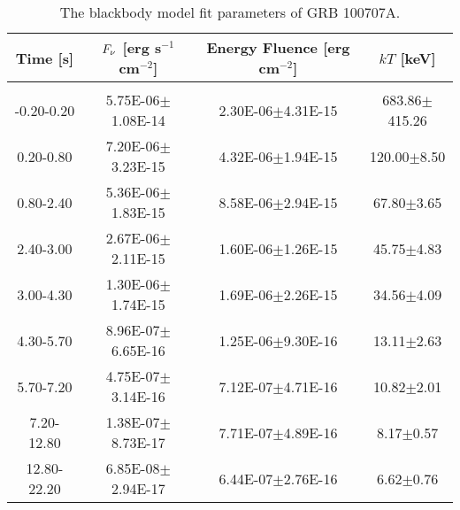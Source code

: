 \begin{table}[h]
\centering
\scriptsize
\label{tab:}
\begin{tabular}{c| c c c}
Time [s] & $F_{\nu}$ [erg s$^{-1}$ cm$^{-2}$] & Energy Fluence [erg cm$^{-2}$] & $kT$ [keV] \\
\hline \hline\\ 

-0.20-0.20 & 5.75E-06$\pm$1.08E-14 & 2.30E-06$\pm$4.31E-15 & 683.86$\pm$415.26 \\ 

0.20-0.80 & 7.20E-06$\pm$3.23E-15 & 4.32E-06$\pm$1.94E-15 & 120.00$\pm$8.50 \\ 

0.80-2.40 & 5.36E-06$\pm$1.83E-15 & 8.58E-06$\pm$2.94E-15 & 67.80$\pm$3.65 \\ 

2.40-3.00 & 2.67E-06$\pm$2.11E-15 & 1.60E-06$\pm$1.26E-15 & 45.75$\pm$4.83 \\ 

3.00-4.30 & 1.30E-06$\pm$1.74E-15 & 1.69E-06$\pm$2.26E-15 & 34.56$\pm$4.09 \\ 

4.30-5.70 & 8.96E-07$\pm$6.65E-16 & 1.25E-06$\pm$9.30E-16 & 13.11$\pm$2.63 \\ 

5.70-7.20 & 4.75E-07$\pm$3.14E-16 & 7.12E-07$\pm$4.71E-16 & 10.82$\pm$2.01 \\ 

7.20-12.80 & 1.38E-07$\pm$8.73E-17 & 7.71E-07$\pm$4.89E-16 & 8.17$\pm$0.57 \\ 

12.80-22.20 & 6.85E-08$\pm$2.94E-17 & 6.44E-07$\pm$2.76E-16 & 6.62$\pm$0.76 \\ 

\end{tabular}
\caption{The blackbody model fit parameters of GRB 100707A.}
\end{table}

